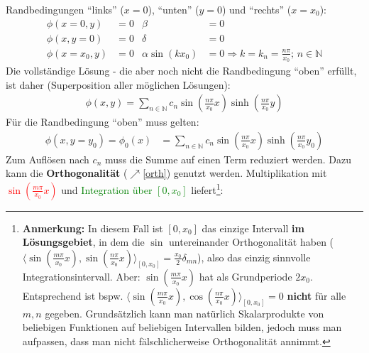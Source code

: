 		   Randbedingungen \enquote{links} ($x=0$), \enquote{unten} ($y=0$) und \enquote{rechts} ($x=x_0$):
		        \begin{align}
			        \phi(x=0,y)    & = 0 & \beta            & =0                                                     \\
			        \phi(x,y=0)    & =0  & \delta           & = 0                                                    \\
			        \phi(x=x_0, y) & = 0 & \alpha\sin(kx_0) & = 0 \Rightarrow k=k_n=\frac{n\pi}{x_0};\,n\in\mathbb{N}
		        \end{align}
		   Die vollständige Lösung - die aber noch nicht die Randbedingung \enquote{oben} erfüllt, ist daher (Superposition aller möglichen Lösungen):
		        \begin{equation}\begin{split}
				        \phi(x,y) = \sum_{n\in\mathbb{N}} c_n \sin\left( \frac{n\pi}{x_0} x \right) \sinh\left( \frac{n\pi}{x_0} y \right)
			        \end{split}\end{equation}
		   Für die Randbedingung \enquote{oben} muss gelten:
		        \begin{equation}\begin{split}
				        \phi(x,y=y_0) = \phi_0(x) &= \sum_{n\in\mathbb{N}} c_n \sin\left( \frac{n\pi}{x_0} x \right) \sinh\left( \frac{n\pi}{x_0} y_0 \right)
			        \end{split}\end{equation}
		   Zum Auflösen nach $c_n$ muss die Summe auf einen Term reduziert werden.
		   Dazu kann die \textbf{Orthogonalität} ($\nearrow$\ref{orth}) genutzt werden. Multiplikation mit \textcolor{red}{$\sin\left( \frac{m\pi}{x_0} x \right)$} und \textcolor{green}{Integration über $[0,x_0]$} liefert\footnote{\label{anmSEP}\textbf{Anmerkung:} In diesem Fall ist $[0,x_0]$ das einzige Intervall \textbf{im Lösungsgebiet}, in dem die $\sin$ untereinander Orthogonalität haben ($\langle\sin\left( \frac{m\pi}{x_0} x \right),\sin\left( \frac{n\pi}{x_0} x \right)\rangle_{[0,x_0]}=\frac{x_0}{2}\delta_{mn}$), also das einzig sinnvolle Integrationsintervall. Aber: $\sin\left( \frac{m\pi}{x_0} x \right)$ hat als Grundperiode $2x_0$. Entsprechend ist bspw. $\langle\sin\left( \frac{m\pi}{x_0} x \right),\cos\left( \frac{n\pi}{x_0} x \right)\rangle_{[0,x_0]}=0$ \textbf{nicht} für alle $m,n$ gegeben. Grundsätzlich kann man natürlich Skalarprodukte von beliebigen Funktionen auf beliebigen Intervallen bilden, jedoch muss man aufpassen, dass man nicht fälschlicherweise Orthogonalität annimmt.}:
